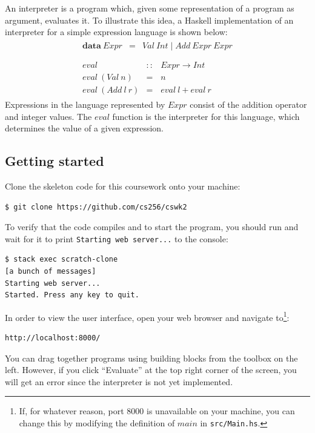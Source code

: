 \documentclass{cs256-shared/cs256}
\begin{document}
An interpreter is a program which, given some representation of a program as argument, evaluates it. To illustrate this idea, a Haskell implementation of an interpreter for a simple expression language is shown below:
\begin{displaymath}
\begin{array}{l}
\begin{array}{lcl}
\mathbf{data}~\mathit{Expr} & = & \mathit{Val}~\mathit{Int} \mid \mathit{Add}~\mathit{Expr}~\mathit{Expr}
\end{array} \\\\
\begin{array}{lcl}
\mathit{eval} & :: & \mathit{Expr} \to \mathit{Int} \\
\mathit{eval}~(\mathit{Val}~n) & = & n\\
\mathit{eval}~(\mathit{Add}~l~r) & = & \mathit{eval}~l + \mathit{eval}~r
\end{array}
\end{array}
\end{displaymath}
Expressions in the language represented by $\mathit{Expr}$ consist of the addition operator and integer values. The $\mathit{eval}$ function is the interpreter for this language, which determines the value of a given expression.

\subsection*{Getting started}

Clone the skeleton code for this coursework onto your machine:
\begin{verbatim}
$ git clone https://github.com/cs256/cswk2
\end{verbatim}
To verify that the code compiles and to start the program, you should run and wait for it to print \texttt{Starting web server...} to the console:
\begin{verbatim}
$ stack exec scratch-clone
[a bunch of messages]
Starting web server...
Started. Press any key to quit.
\end{verbatim}
In order to view the user interface, open your web browser and navigate to\footnote{If, for whatever reason, port 8000 is unavailable on your machine, you can change this by modifying the definition of $\mathit{main}$ in \texttt{src/Main.hs}.}:
\begin{verbatim}
http://localhost:8000/
\end{verbatim}
You can drag together programs using building blocks from the toolbox on the left. However, if you click ``Evaluate'' at the top right corner of the screen, you will get an error since the interpreter is not yet implemented.
\end{document}
